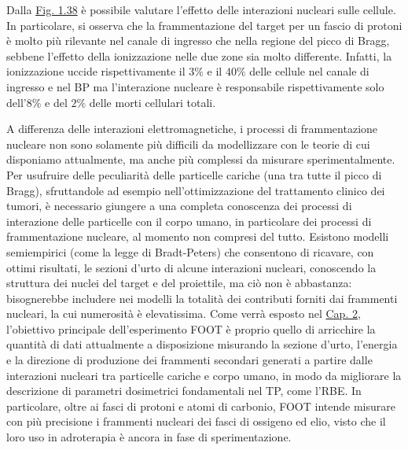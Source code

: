\documentclass[12pt,a4paper,twoside]{report}
\begin{document}
	Dalla \hyperref[fig:biol_effect_nuclear]{Fig. 1.38} è possibile valutare l'effetto delle interazioni nucleari sulle cellule. In particolare, si osserva che la frammentazione del target per un fascio di protoni è molto più rilevante nel canale di ingresso che nella regione del picco di Bragg, sebbene l'effetto della ionizzazione nelle due zone sia molto differente. Infatti, la ionizzazione uccide rispettivamente il $3\%$ e il $40\%$ delle cellule nel canale di ingresso e nel BP ma l'interazione nucleare è responsabile rispettivamente solo dell'$8\%$ e del $2\%$ delle morti cellulari totali.
	
	A differenza delle interazioni elettromagnetiche, i processi di frammentazione nucleare non sono solamente più difficili da modellizzare con le teorie di cui disponiamo attualmente, ma anche più complessi da misurare sperimentalmente. Per usufruire delle peculiarità delle particelle cariche (una tra tutte il picco di Bragg), sfruttandole ad esempio nell'ottimizzazione del trattamento clinico dei tumori, è necessario giungere a una completa conoscenza dei processi di interazione delle particelle con il corpo umano, in particolare dei processi di frammentazione nucleare, al momento non compresi del tutto. Esistono modelli semiempirici (come la legge di Bradt-Peters) che consentono di ricavare, con ottimi risultati, le sezioni d'urto di alcune interazioni nucleari, conoscendo la struttura dei nuclei del target e del proiettile, ma ciò non è abbastanza: bisognerebbe includere nei modelli la totalità dei contributi forniti dai frammenti nucleari, la cui numerosità è elevatissima. Come verrà esposto nel \hyperref[cap:2]{Cap. 2}, l'obiettivo principale dell'esperimento FOOT è proprio quello di arricchire la quantità di dati attualmente a disposizione misurando la sezione d'urto, l'energia e la direzione di produzione dei frammenti secondari generati a partire dalle interazioni nucleari tra particelle cariche e corpo umano, in modo da migliorare la descrizione di parametri dosimetrici fondamentali nel TP, come l'RBE. In particolare, oltre ai fasci di protoni e atomi di carbonio, FOOT intende misurare con più precisione i frammenti nucleari dei fasci di ossigeno ed elio, visto che il loro uso in adroterapia è ancora in fase di sperimentazione.
	
\end{document}
